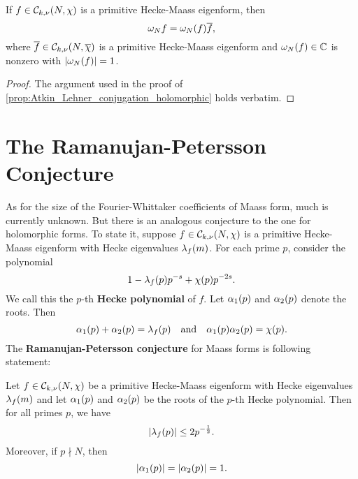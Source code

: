     \begin{proposition}\label{prop:Atkin_Lehner_conjugation_Maass}
      If $f \in \mathcal{C}_{k,\nu}(N,\chi)$ is a primitive Hecke-Maass eigenform, then
      \[
        \omega_{N}f = \omega_{N}(f)\overline{f},
      \]
      where $\overline{f} \in \mathcal{C}_{k,\nu}(N,\overline{\chi})$ is a primitive Hecke-Maass eigenform and $\omega_{N}(f) \in \mathbb{C}$ is nonzero with $|\omega_{N}(f)| = 1$.
    \end{proposition}
    \begin{proof}
      The argument used in the proof of \cref{prop:Atkin_Lehner_conjugation_holomorphic} holds verbatim.
    \end{proof}
  \section{The Ramanujan-Petersson Conjecture}
    As for the size of the Fourier-Whittaker coefficients of Maass form, much is currently unknown. But there is an analogous conjecture to the one for holomorphic forms. To state it, suppose $f \in \mathcal{C}_{k,\nu}(N,\chi)$ is a primitive Hecke-Maass eigenform with Hecke eigenvalues $\lambda_{f}(m)$. For each prime $p$, consider the polynomial
    \[
      1-\lambda_{f}(p)p^{-s}+\chi(p)p^{-2s}.
    \]
    We call this the $p$-th \textbf{Hecke polynomial} of $f$. Let $\alpha_{1}(p)$ and $\alpha_{2}(p)$ denote the roots. Then
    \[
      \alpha_{1}(p)+\alpha_{2}(p) = \lambda_{f}(p) \quad \text{and} \quad \alpha_{1}(p)\alpha_{2}(p) = \chi(p).
    \]
    The \textbf{Ramanujan-Petersson conjecture} for Maass forms is following statement:

    \begin{conjecture}
      Let $f \in \mathcal{C}_{k,\nu}(N,\chi)$ be a primitive Hecke-Maass eigenform with Hecke eigenvalues $\lambda_{f}(m)$ and let $\alpha_{1}(p)$ and $\alpha_{2}(p)$ be the roots of the $p$-th Hecke polynomial. Then for all primes $p$, we have
      \[
        |\lambda_{f}(p)| \le 2p^{-\frac{1}{2}}.
      \]
      Moreover, if $p \nmid N$, then
      \[
        |\alpha_{1}(p)| = |\alpha_{2}(p)| = 1.
      \]
    \end{conjecture}

